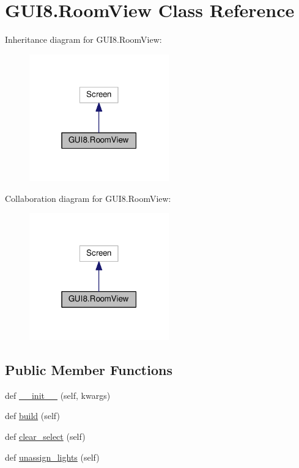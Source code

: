 \hypertarget{classGUI8_1_1RoomView}{}\section{G\+U\+I8.\+Room\+View Class Reference}
\label{classGUI8_1_1RoomView}


Inheritance diagram for G\+U\+I8.\+Room\+View\+:
\nopagebreak
\begin{figure}[H]
\begin{center}
\leavevmode
\includegraphics[width=171pt]{classGUI8_1_1RoomView__inherit__graph}
\end{center}
\end{figure}


Collaboration diagram for G\+U\+I8.\+Room\+View\+:
\nopagebreak
\begin{figure}[H]
\begin{center}
\leavevmode
\includegraphics[width=171pt]{classGUI8_1_1RoomView__coll__graph}
\end{center}
\end{figure}
\subsection*{Public Member Functions}
\begin{DoxyCompactItemize}
\item 
def \hyperlink{classGUI8_1_1RoomView_a56a12e93ac665ca3d73291cc02a97ba2}{\+\_\+\+\_\+init\+\_\+\+\_\+} (self, kwargs)
\item 
def \hyperlink{classGUI8_1_1RoomView_a361365528c93e71bfaeccaed56418c4b}{build} (self)
\item 
def \hyperlink{classGUI8_1_1RoomView_a815a4cc44e55b00a30bec9ffbe0bee49}{clear\+\_\+select} (self)
\item 
def \hyperlink{classGUI8_1_1RoomView_a630d459430150058c291ce7fe98d3189}{unassign\+\_\+lights} (self)
\end{DoxyCompactItemize}

